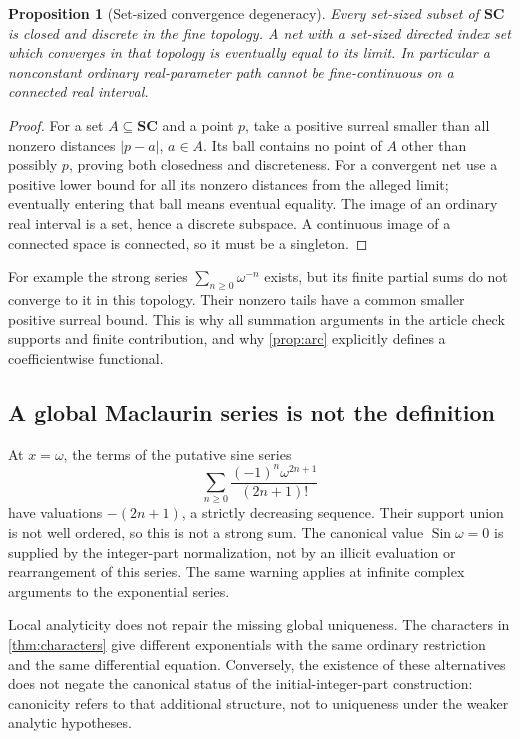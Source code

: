 \documentclass[11pt,letterpaper]{article}
\newtheorem{proposition}[theorem]{Proposition}
\theoremstyle{definition}
\theoremstyle{remark}
\newcommand{\SC}{\mathbf{SC}}
\newcommand{\Sin}{\operatorname{Sin}}
\numberwithin{equation}{section}
\begin{document}
\begin{proposition}[Set-sized convergence degeneracy]\label{prop:topology}
Every set-sized subset of $\SC$ is closed and discrete in the fine topology. A net with a set-sized directed index set which converges in that topology is eventually equal to its limit. In particular a nonconstant ordinary real-parameter path cannot be fine-continuous on a connected real interval.
\end{proposition}
\begin{proof}
For a set $A\subseteq\SC$ and a point $p$, take a positive surreal smaller than all nonzero distances $|p-a|$, $a\in A$. Its ball contains no point of $A$ other than possibly $p$, proving both closedness and discreteness. For a convergent net use a positive lower bound for all its nonzero distances from the alleged limit; eventually entering that ball means eventual equality. The image of an ordinary real interval is a set, hence a discrete subspace. A continuous image of a connected space is connected, so it must be a singleton.
\end{proof}
For example the strong series $\sum_{n\ge0}\omega^{-n}$ exists, but its finite partial sums do not converge to it in this topology. Their nonzero tails have a common smaller positive surreal bound. This is why all summation arguments in the article check supports and finite contribution, and why \cref{prop:arc} explicitly defines a coefficientwise functional.

\subsection{A global Maclaurin series is not the definition}
At $x=\omega$, the terms of the putative sine series
\[
 \sum_{n\ge0}\frac{(-1)^n\omega^{2n+1}}{(2n+1)!}
\]
have valuations $-(2n+1)$, a strictly decreasing sequence. Their support union is not well ordered, so this is not a strong sum. The canonical value $\Sin\omega=0$ is supplied by the integer-part normalization, not by an illicit evaluation or rearrangement of this series. The same warning applies at infinite complex arguments to the exponential series.

Local analyticity does not repair the missing global uniqueness. The characters in \cref{thm:characters} give different exponentials with the same ordinary restriction and the same differential equation. Conversely, the existence of these alternatives does not negate the canonical status of the initial-integer-part construction: canonicity refers to that additional structure, not to uniqueness under the weaker analytic hypotheses.
\end{document}
